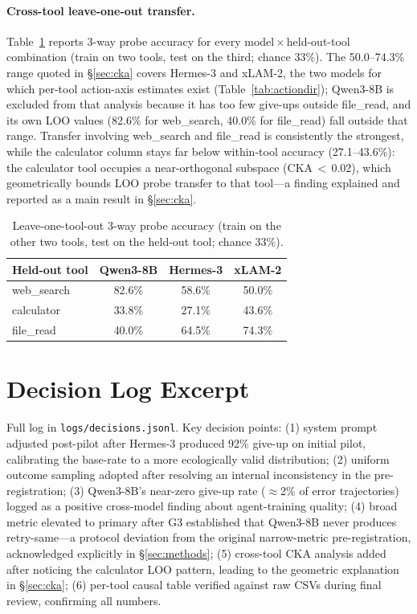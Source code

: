 \documentclass{article}
\begin{document}
\paragraph{Cross-tool leave-one-out transfer.}
Table~\ref{tab:loo} reports 3-way probe accuracy for every
model\,$\times$\,held-out-tool combination (train on two tools, test
on the third; chance 33\%).
The 50.0--74.3\% range quoted in \S\ref{sec:cka} covers Hermes-3 and
xLAM-2, the two models for which per-tool action-axis estimates exist
(Table~\ref{tab:actiondir}); Qwen3-8B is excluded from that analysis
because it has too few give-ups outside file\_read, and its own LOO
values (82.6\% for web\_search, 40.0\% for file\_read) fall outside
that range.
Transfer involving web\_search and file\_read is consistently the
strongest, while the calculator column stays far below within-tool
accuracy (27.1--43.6\%): the calculator tool occupies a near-orthogonal
subspace (CKA\,$<$\,0.02), which geometrically bounds LOO probe
transfer to that tool---a finding explained and reported as a main
result in \S\ref{sec:cka}.

\begin{table}[h]
\caption{Leave-one-tool-out 3-way probe accuracy (train on the other
two tools, test on the held-out tool; chance 33\%).}
\label{tab:loo}
\centering\small
\begin{tabular}{lccc}
\toprule
Held-out tool & Qwen3-8B & Hermes-3 & xLAM-2 \\
\midrule
web\_search & 82.6\% & 58.6\% & 50.0\% \\
calculator  & 33.8\% & 27.1\% & 43.6\% \\
file\_read  & 40.0\% & 64.5\% & 74.3\% \\
\bottomrule
\end{tabular}
\end{table}

\section{Decision Log Excerpt}
\label{app:decisions}

Full log in \texttt{logs/decisions.jsonl}.  Key decision points:
(1) system prompt adjusted post-pilot after Hermes-3 produced 92\%
give-up on initial pilot, calibrating the base-rate to a more
ecologically valid distribution;
(2) uniform outcome sampling adopted after resolving an internal
inconsistency in the pre-registration;
(3) Qwen3-8B's near-zero give-up rate ($\approx$2\% of error
trajectories) logged as a positive cross-model finding about
agent-training quality;
(4) broad metric elevated to primary after G3 established that
Qwen3-8B never produces retry-same---a protocol deviation from the
original narrow-metric pre-registration, acknowledged explicitly in
\S\ref{sec:methods};
(5) cross-tool CKA analysis added after noticing the calculator
LOO pattern, leading to the geometric explanation in \S\ref{sec:cka};
(6) per-tool causal table verified against raw CSVs during final
review, confirming all numbers.
\end{document}
